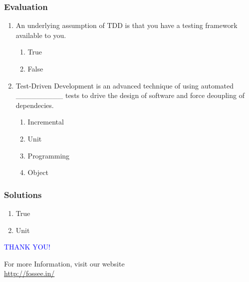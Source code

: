 \documentclass[12pt,presentation]{beamer}
\begin{document}
\begin{frame}[fragile]
\frametitle{Evaluation}
\label{sec-9}


\begin{enumerate}
\item An underlying assumption of TDD is that you have a testing framework available to you.\\
  \begin{enumerate}
  \item True
  \item False
  \end{enumerate}
\vspace{8pt}
\item Test-Driven Development is an advanced technique of using automated \_\_\_\_\_\_\_\_\_ tests to drive the design of software and force deoupling of dependecies.\\
  \begin{enumerate}
  \item Incremental
  \item Unit
  \item Programming
  \item Object
  \end{enumerate}
\end{enumerate}
\end{frame}
\begin{frame}
\frametitle{Solutions}
\label{sec-10}


\begin{enumerate}
\item True
\vspace{15pt}
\item Unit
\end{enumerate}
\end{frame}

\begin{frame}

  \begin{block}{}
  \begin{center}
  \textcolor{blue}{\Large THANK YOU!} 
  \end{center}
  \end{block}
\begin{block}{}
  \begin{center}
    For more Information, visit our website\\
    \url{http://fossee.in/}
  \end{center}  
  \end{block}
\end{frame}
\end{document}
